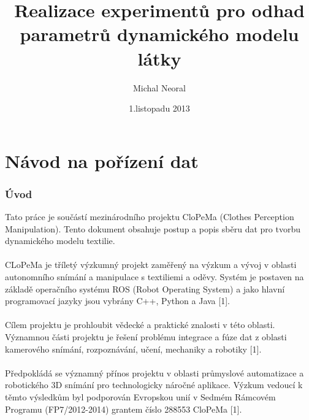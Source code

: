 \documentclass[10pt,a4paper,titlepage,oneside]{book}
\begin{document}
\title{Realizace experimentů pro odhad parametrů dynamického modelu látky}
\author{Michal Neoral}
\date{1.listopadu 2013}
\maketitle

\thispagestyle{fancy}

\part*{Návod na pořízení dat}


\newpage

\section*{Úvod}

Tato práce je součástí mezinárodního projektu CloPeMa (Clothes Perception Manipulation). Tento dokument obsahuje postup a popis sběru dat pro tvorbu dynamického modelu textilie.\\
\\
CLoPeMa je tříletý výzkumný projekt zaměřený na výzkum a vývoj v oblasti autonomního snímání a manipulace s textiliemi a oděvy. Systém je postaven na základě operačního systému ROS (Robot Operating System) a jako hlavní programovací jazyky jsou vybrány C++, Python a Java [1].\\
\\
Cílem projektu je prohloubit vědecké a praktické znalosti v této oblasti. Významnou části projektu je řešení problému integrace a fúze dat z oblasti kamerového snímání, rozpoznávání, učení, mechaniky a robotiky [1].\\
\\
Předpokládá se významný přínos projektu v oblasti průmyslové automatizace a robotického 3D snímání pro technologicky náročné aplikace. Výzkum vedoucí k těmto výsledkům byl podporován Evropskou unií v Sedmém Rámcovém Programu (FP7/2012-2014) grantem číslo 288553 CloPeMa [1].\\
\\
\end{document}
